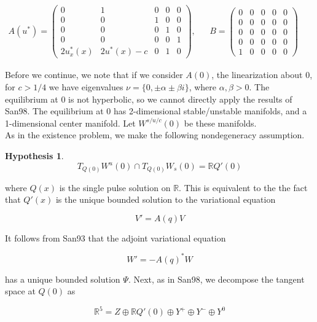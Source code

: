 \documentclass[12pt]{article}
\def\R{{\mathbb R}}
\newtheorem{hypothesis}{Hypothesis}
\begin{document}
\begin{align}
A(u^*) = \begin{pmatrix}0 & 1 & 0 & 0 & 0 \\0 & 0 & 1 & 0 & 0 \\0 & 0 & 0 & 1 & 0 \\0 & 0 & 0 & 0 & 1 \\
2u^*_x(x) & 2u^*(x) - c & 0 & 1 & 0 \end{pmatrix}, &&
B = \begin{pmatrix}0 & 0 & 0 & 0 & 0 \\0 & 0 & 0 & 0 & 0 \\0  & 0 & 0 & 0 & 0 \\0 & 0 & 0 & 0 & 0 \\1 & 0 & 0 & 0 & 0 \end{pmatrix} && 
\end{align}

Before we continue, we note that if we consider $A(0)$, the linearization about 0, for $c > 1/4$ we have eigenvalues $\nu = \{ 0, \pm \alpha \pm \beta i\}$, where $\alpha, \beta > 0$. The equilibrium at 0 is not hyperbolic, so we cannot directly apply the results of San98. The equilibrium at 0 has 2-dimensional stable/unstable manifolds, and a 1-dimensional center manifold. Let $W^{s/u/c}(0)$ be these manifolds.\\

As in the existence problem, we make the following nondegeneracy assumption.

\begin{hypothesis}
\[
T_{Q(0)} W^u(0) \cap T_{Q(0)} W_s(0) = \R Q'(0)
\]
\end{hypothesis}

where $Q(x)$ is the single pulse solution on $\R$. This is equivalent to the the fact that $Q'(x)$ is the unique bounded solution to the variational equation

\begin{equation}
V' = A(q)V
\end{equation}

It follows from San93 that the adjoint variational equation

\begin{equation}
W' = -A(q)^*W
\end{equation}

has a unique bounded solution $\Psi$. Next, as in San98, we decompose the tangent space at $Q(0)$ as

\begin{equation}
\R^5 = Z \oplus \R Q'(0) \oplus Y^+ \oplus Y^- \oplus Y^0
\end{equation}
\end{document}
